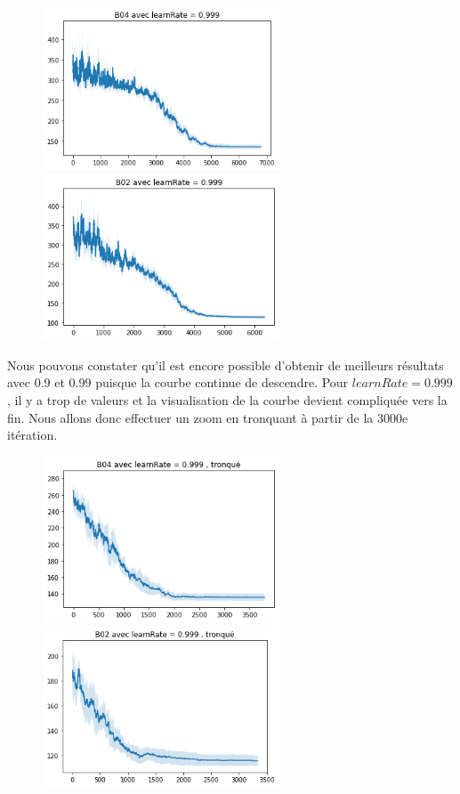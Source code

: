\documentclass{article}
\begin{document}
\begin{figure}[H]
	\centerline{ \includegraphics[width=7cm]{images/B04learnrate0999.png} \includegraphics[width=7cm]{images/B02learnrate0999.png} } 
\end{figure}

Nous pouvons constater qu'il est encore possible d'obtenir de meilleurs résultats avec 0.9 et 0.99 puisque la courbe continue de descendre. Pour $learnRate=0.999$, il y a trop de valeurs et la visualisation de la courbe devient compliquée vers la fin. Nous allons donc effectuer un zoom en tronquant à partir de la 3000e itération.

\begin{figure}[H]
	\centerline{ \includegraphics[width=7cm]{images/B04learnrate0999t.png} \includegraphics[width=7cm]{images/B02learnrate0999t.png} } 
\end{figure}
\end{document}
